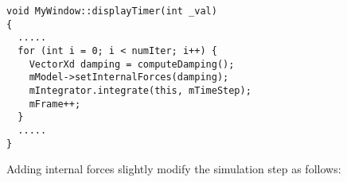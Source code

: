 \ttfamily
\begin{lstlisting}[label=displayTimer,caption=displayTimer]
void MyWindow::displayTimer(int _val)
{
  .....
  for (int i = 0; i < numIter; i++) {
    VectorXd damping = computeDamping();
    mModel->setInternalForces(damping);
    mIntegrator.integrate(this, mTimeStep);
    mFrame++;
  }
  .....
}
\end{lstlisting}
\rmfamily

Adding internal forces slightly modify the simulation step as follows:


